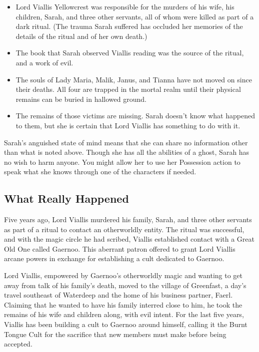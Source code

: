 \documentclass[10pt,a4paper,twoside,bg=print,twocolumn,openany,nodeprecatedcode]{dndbook}
\begin{document}
\begin{itemize}
\item Lord Viallis Yellowcrest was responsible for the murders of his wife, his children, Sarah, and three other servants, all of whom were killed as part of a dark ritual. (The trauma Sarah suffered has occluded her memories of the details of the ritual and of her own death.)
\item The book that Sarah observed Viallis reading was the source of the ritual, and a work of evil.
\item The souls of Lady Maria, Malik, Janus, and Tianna have not moved on since their deaths. All four are trapped in the mortal realm until their physical remains can be buried in hallowed ground.
\item The remains of those victims are missing. Sarah doesn't know what happened to them, but she is certain that Lord Viallis has something to do with it.
\end{itemize}

Sarah's anguished state of mind means that she can share no information other than what is noted above. Though she has all the abilities of a ghost, Sarah has no wish to harm anyone. You might allow her to use her Possession action to speak what she knows through one of the characters if needed.

\subsection{What Really Happened}
Five years ago, Lord Viallis murdered his family, Sarah, and three other servants as part of a ritual to contact an otherworldly entity. The ritual was successful, and with the magic circle he had scribed, Viallis established contact with a Great Old One called Gaernoo. This aberrant patron offered to grant Lord Viallis arcane powers in exchange for establishing a cult dedicated to Gaernoo.

Lord Viallis, empowered by Gaernoo's otherworldly magic and wanting to get away from talk of his family's death, moved to the village of Greenfast, a day's travel southeast of Waterdeep and the home of his business partner, Faerl. Claiming that he wanted to have his family interred close to him, he took the remains of his wife and children along, with evil intent. For the last five years, Viallis has been building a cult to Gaernoo around himself, calling it the Burnt Tongue Cult for the sacrifice that new members must make before being accepted.
\end{document}
